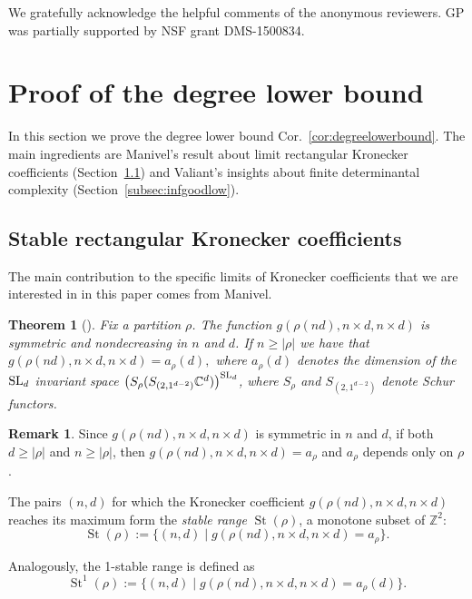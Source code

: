 \documentclass{article}
\numberwithin{equation}{section}
\newtheorem{theorem}[equation]{Theorem}
\theoremstyle{definition}
\newtheorem{remark}[equation]{Remark}
\newcommand{\rightbox}{\hfill\scalebox{0.8}{$\blacksquare$}}
\def\SL{ {\text {\rm SL} } }
\newcommand{\IC}{\mathbb C}
\DeclareMathOperator{\St}{St}
\begin{document}

We gratefully acknowledge the helpful comments of the anonymous reviewers. GP was partially supported by NSF grant DMS-1500834.





\section{Proof of the degree lower bound}\label{sec:degreelowerbound}
In this section we prove the degree lower bound Cor.~\ref{cor:degreelowerbound}.
The main ingredients are Manivel's result about limit rectangular Kronecker coefficients (Section~\ref{subsec:manivel})
and Valiant's insights about finite determinantal complexity (Section~\ref{subsec:infgoodlow}).
\subsection{Stable rectangular Kronecker coefficients}\label{subsec:manivel}
The main contribution to the specific limits of Kronecker coefficients that we are interested in in this paper comes from Manivel.
\begin{theorem}[{\cite[Thm.~1]{man:11}}]\label{thm:manivel_rect}
Fix a partition $\rho$.
The function $g(\rho(nd), n \times d, n \times d)$ is symmetric and nondecreasing in $n$ and $d$.
If $n \geq |\rho|$ we have that 
$g(\rho(nd), n \times d, n \times d) = a_{\rho}(d),$
where $a_\rho(d)$ denotes the dimension of the $\SL_d$ invariant space $\big(S_\rho(S_{(2,1^{d-2})} \IC^d )\big)^{\SL_d}$,
where $S_\rho$ and $S_{(2,1^{d-2})}$ denote Schur functors.
\end{theorem}

\begin{remark}
Since $g(\rho(nd), n \times d, n \times d)$ is symmetric in $n$ and $d$,
if both $d \geq |\rho|$ and $n \geq |\rho|$, then
$g(\rho(nd), n \times d, n \times d) = a_\rho$ and $a_{\rho}$ depends only on $\rho$. \rightbox
\end{remark}

The pairs $(n,d)$ for which the Kronecker coefficient $g(\rho(nd), n \times d, n \times d)$ reaches its maximum form the \emph{stable range} $\St(\rho)$,
a monotone subset of $\mathbb{Z}^2$:
\[
\St(\rho) := \{(n,d)  \mid  g(\rho(nd) , n \times d, n\times d) = a_\rho \}.
\]

Analogously, the 1-stable range is defined as
\[
\St^1(\rho) := \{(n,d)  \mid  g(\rho(nd) , n \times d, n\times d) = a_\rho(d) \}.
\]
\end{document}
